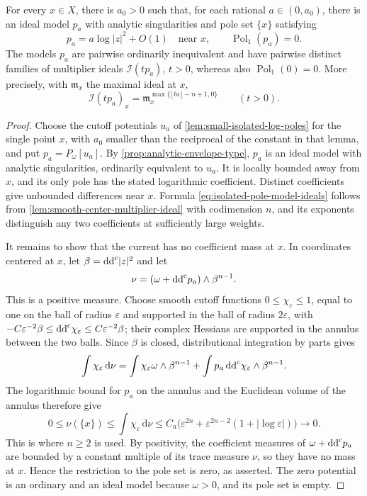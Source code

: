 \begin{proposition}\label{prop:isolated-pole-polar-current-blindness}
For every $x\in X$, there is $a_0>0$ such that, for each rational $a\in(0,a_0)$, there is an ideal model $p_a$ with analytic singularities and pole set $\{x\}$ satisfying
\[
 p_a=a\log|z|^2+O(1)\quad\text{near }x,\qquad
 \operatorname{Pol}_1(p_a)=0.
\]
The models $p_a$ are pairwise ordinarily inequivalent and have pairwise distinct families of multiplier ideals $\mathcal I(tp_a)$, $t>0$, whereas also $\operatorname{Pol}_1(0)=0$. More precisely, with $\mathfrak m_x$ the maximal ideal at $x$,
\begin{equation}\label{eq:isolated-pole-model-ideals}
 \mathcal I(tp_a)_x
       =\mathfrak m_x^{\max\{\lfloor ta\rfloor-n+1,0\}}
       \qquad(t>0).
\end{equation}
\end{proposition}
\begin{proof}
Choose the cutoff potentials $u_a$ of \cref{lem:small-isolated-log-poles} for the single point $x$, with $a_0$ smaller than the reciprocal of the constant in that lemma, and put $p_a=P_\omega[u_a]$. By \cref{prop:analytic-envelope-type}, $p_a$ is an ideal model with analytic singularities, ordinarily equivalent to $u_a$. It is locally bounded away from $x$, and its only pole has the stated logarithmic coefficient. Distinct coefficients give unbounded differences near $x$. Formula \eqref{eq:isolated-pole-model-ideals} follows from \cref{lem:smooth-center-multiplier-ideal} with codimension $n$, and its exponents distinguish any two coefficients at sufficiently large weights.

It remains to show that the current has no coefficient mass at $x$. In coordinates centered at $x$, let $\beta=\mathrm{dd}^{\mathrm{c}}|z|^2$ and let
\[
 \nu=(\omega+\mathrm{dd}^{\mathrm{c}} p_a)\wedge\beta^{n-1}.
\]
This is a positive measure. Choose smooth cutoff functions $0\leq\chi_\varepsilon\leq1$, equal to one on the ball of radius $\varepsilon$ and supported in the ball of radius $2\varepsilon$, with $-C\varepsilon^{-2}\beta\leq\mathrm{dd}^{\mathrm{c}}\chi_\varepsilon\leq C\varepsilon^{-2}\beta$; their complex Hessians are supported in the annulus between the two balls. Since $\beta$ is closed, distributional integration by parts gives
\[
 \int\chi_\varepsilon\,\mathrm d\nu
 =\int\chi_\varepsilon\omega\wedge\beta^{n-1}
       +\int p_a\,\mathrm{dd}^{\mathrm{c}}\chi_\varepsilon\wedge\beta^{n-1}.
\]
The logarithmic bound for $p_a$ on the annulus and the Euclidean volume of the annulus therefore give
\[
 0\leq\nu(\{x\})\leq\int\chi_\varepsilon\,\mathrm d\nu
 \leq C_a\bigl(\varepsilon^{2n}
        +\varepsilon^{2n-2}(1+|\log\varepsilon|)\bigr)
       \longrightarrow0.
\]
This is where $n\geq2$ is used. By positivity, the coefficient measures of $\omega+\mathrm{dd}^{\mathrm{c}} p_a$ are bounded by a constant multiple of its trace measure $\nu$, so they have no mass at $x$. Hence the restriction to the pole set is zero, as asserted. The zero potential is an ordinary and an ideal model because $\omega>0$, and its pole set is empty.
\end{proof}

